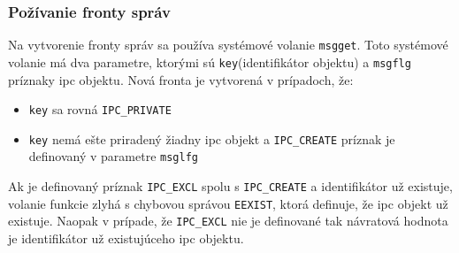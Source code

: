 \subsubsection{Požívanie fronty správ} \label{msguse}
Na vytvorenie fronty správ sa používa systémové volanie \texttt{msgget}. Toto systémové volanie má dva parametre, ktorými sú \texttt{key}(identifikátor objektu) a \texttt{msgflg} príznaky \acrshort{ipc} objektu. Nová fronta je vytvorená v prípadoch, že:
\begin{itemize}
\item \texttt{key} sa rovná \texttt{IPC\_PRIVATE}
\item \texttt{key} nemá ešte priradený žiadny \acrshort{ipc} objekt a \texttt{IPC\_CREATE} príznak je definovaný v parametre \texttt{msglfg}
\end{itemize}
Ak je definovaný príznak \texttt{IPC\_EXCL} spolu s \texttt{IPC\_CREATE} a identifikátor už existuje, volanie funkcie zlyhá s chybovou správou \texttt{EEXIST}, ktorá definuje, že \acrshort{ipc} objekt už existuje. Naopak v prípade, že \texttt{IPC\_EXCL} nie je definované tak návratová hodnota je identifikátor už existujúceho \acrshort{ipc} objektu.\cite{msgget}

